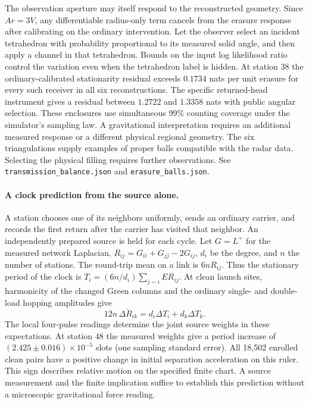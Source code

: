 \documentclass[11pt]{article}
\begin{document}
The observation aperture may itself respond to the reconstructed
geometry. Since \(Ar=3V\), any differentiable radius-only term
cancels from the erasure response after calibrating on the ordinary
intervention. Let the observer select an incident tetrahedron with
probability proportional to its measured solid angle, and then apply
a channel in that tetrahedron. Bounds on the input log likelihood
ratio control the variation even when the tetrahedron label is
hidden. At station 38 the ordinary-calibrated stationarity residual
exceeds \(0.1734\) nats per unit erasure for every such receiver in
all six reconstructions. The specific returned-head instrument gives
a residual between \(1.2722\) and \(1.3358\) nats with public angular
selection. These enclosures use simultaneous 99\% counting coverage
under the simulator's sampling law. A gravitational interpretation
requires an additional measured response or a different physical
regional geometry. The six triangulations supply examples of proper
balls compatible with the radar data. Selecting the physical filling
requires further observations. See \texttt{transmission\_balance.json} and
\texttt{erasure\_balls.json}.

\paragraph{A clock prediction from the source alone.}
A station chooses one of its neighbors uniformly, sends an ordinary
carrier, and records the first return after the carrier has visited
that neighbor. An independently prepared source is held for each
cycle. Let \(G=L^+\) for the measured network Laplacian,
\(R_{ij}=G_{ii}+G_{jj}-2G_{ij}\), \(d_i\) be the degree, and \(n\)
the number of stations. The round-trip mean on a link is \(6nR_{ij}\).
Thus the stationary period of the clock is
\(T_i=(6n/d_i)\sum_{j\sim i} E R_{ij}\).
At clean launch sites, harmonicity of the changed Green columns
and the ordinary single- and double-load hopping amplitudes give
\[
  12n\,\Delta\ddot R_{ik}=d_i\Delta T_i+d_k\Delta T_k .
\]
The local four-pulse readings determine the joint source weights in
these expectations. At station 48 the measured weights give a period
increase of \((2.425\pm0.016)\times10^{-5}\) slots (one sampling
standard error). All 18,502 enrolled clean pairs have a positive
change in initial separation acceleration on this ruler. This sign
describes relative motion on the specified finite chart. A source
measurement and the finite implication suffice to establish this
prediction without a microscopic gravitational force reading.
\end{document}
